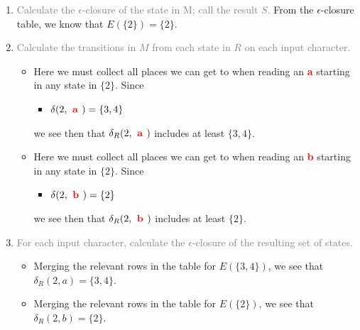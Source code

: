\documentclass{article}
\begin{document}
\begin{enumerate}
    \item \textcolor{gray}{Calculate the $\epsilon$-closure of the state in M; call the result $S$.} 
    From the $\epsilon$-closure table, we know that $E(\{ 2 \})=\{ {2} \}$. 
    
    \item \textcolor{gray}{Calculate the transitions in $M$ from each state in $R$ on each input character.} 
    \begin{itemize}
        
            \item [\textcolor{red}{\textbf{ a }}] 
            Here we must collect all places we can get to when reading an \textcolor{red}{\textbf{ a }}
            starting in any state in $\{ {2} \}$. 
            Since
            \begin{itemize}\item $\delta(2, \textcolor{red}{\textbf{ a }}) = \{3,4\}
$
            \end{itemize}
            we see then that $\delta_R(2,\textcolor{red}{\textbf{ a }})$ includes at least $\{ {3, 4} \}$.
        
            \item [\textcolor{red}{\textbf{ b }}] 
            Here we must collect all places we can get to when reading an \textcolor{red}{\textbf{ b }}
            starting in any state in $\{ {2} \}$. 
            Since
            \begin{itemize}\item $\delta(2, \textcolor{red}{\textbf{ b }}) = \{2\}
$
            \end{itemize}
            we see then that $\delta_R(2,\textcolor{red}{\textbf{ b }})$ includes at least $\{ {2} \}$.
        
    \end{itemize}

    \item \textcolor{gray}{For each input character, calculate the $\epsilon$-closure of the resulting set of states.}   
    \begin{itemize}
    
            \item [\textcolor{red}{\textbf{ a }}] 
            Merging the relevant rows in the table for $E(\{ {3, 4} \})$, 
            we see that $\delta_R( 2, a )=\{ {3, 4} \}$. 
        
            \item [\textcolor{red}{\textbf{ b }}] 
            Merging the relevant rows in the table for $E(\{ {2} \})$, 
            we see that $\delta_R( 2, b )=\{ {2} \}$. 
        
    \end{itemize}
\end{enumerate}
\end{document}
